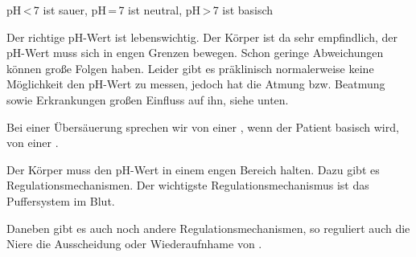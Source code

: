 {%



pH\,{\textless}\,7 ist sauer, pH\,=\,7 ist neutral,
pH\,{\textgreater}\,7 ist basisch



Der richtige pH-Wert ist lebenswichtig. Der Körper ist da sehr empfindlich, der
pH-Wert muss sich in engen Grenzen bewegen. Schon geringe
Abweichungen können große Folgen haben. Leider gibt es präklinisch normalerweise keine Möglichkeit
den pH-Wert zu messen, jedoch hat die Atmung bzw. Beatmung sowie Erkrankungen
 großen Einfluss auf ihn, siehe unten.

Bei einer Übersäuerung sprechen wir von einer
, wenn der Patient basisch wird, 
von einer .

}{}{}{}{}

{%
%
Der Körper muss den pH-Wert in einem engen Bereich halten. Dazu gibt es
Regulationsmechanismen. Der wichtigste Regulationsmechanismus ist das
Puffersystem im Blut.~

Daneben gibt es auch noch andere Regulationsmechanismen, so reguliert auch die
Niere die Ausscheidung oder Wiederaufnhame von .

}{}{}{}{}

